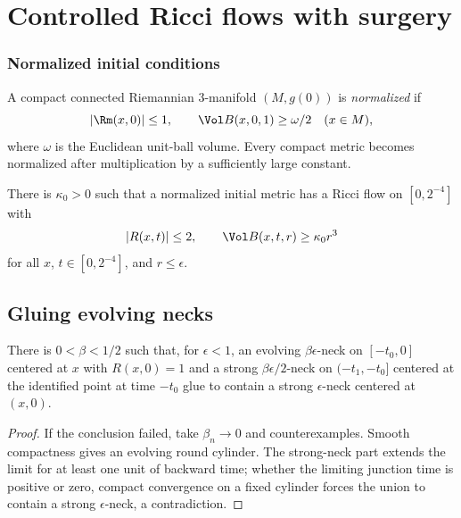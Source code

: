 \chapter{Controlled Ricci flows with surgery}
\label{chap:controlled-ricci-flows}

\subsection{Normalized initial conditions}

A compact connected Riemannian $3$-manifold $(M,g(0))$ is
\emph{normalized} if
\[
  |\Rm(x,0)|\leq1,
  \qquad
  \Vol B(x,0,1)\geq\omega/2
  \quad(x\in M),
\]
where $\omega$ is the Euclidean unit-ball volume. Every compact metric becomes
normalized after multiplication by a sufficiently large constant.

\begin{claim}
\label{claim:normalized-initial-existence}
\label{newkappa0r0t0}
There is $\kappa_0>0$ such that a normalized initial metric has a Ricci flow
on $[0,2^{-4}]$ with
\[
  |R(x,t)|\leq2,
  \qquad
  \Vol B(x,t,r)\geq\kappa_0r^3
\]
for all $x$, $t\in[0,2^{-4}]$, and $r\leq\epsilon$.
\end{claim}

\section{Gluing evolving necks}

\begin{proposition}
\label{prop:neck-gluing}
\label{neckglue}
There is $0<\beta<1/2$ such that, for $\epsilon<1$, an evolving
$\beta\epsilon$-neck on $[-t_0,0]$ centered at $x$ with $R(x,0)=1$ and a
strong $\beta\epsilon/2$-neck on $(-t_1,-t_0]$ centered at the identified point
at time $-t_0$ glue to contain a strong $\epsilon$-neck centered at $(x,0)$.
\end{proposition}

\begin{proof}
\sketch
If the conclusion failed, take $\beta_n\to0$ and counterexamples. Smooth
compactness gives an evolving round cylinder. The strong-neck part extends the
limit for at least one unit of backward time; whether the limiting junction time
is positive or zero, compact convergence on a fixed cylinder forces the union to
contain a strong $\epsilon$-neck, a contradiction.
\end{proof}

